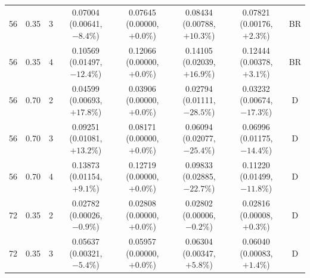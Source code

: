 \begin{longtable}{rrrccccc}
56 & 0.35 & 3 & \shortstack{0.07004\\(0.00641, $-8.4\%$)} & \shortstack{0.07645\\(0.00000, $+0.0\%$)} & \shortstack{0.08434\\(0.00788, $+10.3\%$)} & \shortstack{0.07821\\(0.00176, $+2.3\%$)} & BR \\
56 & 0.35 & 4 & \shortstack{0.10569\\(0.01497, $-12.4\%$)} & \shortstack{0.12066\\(0.00000, $+0.0\%$)} & \shortstack{0.14105\\(0.02039, $+16.9\%$)} & \shortstack{0.12444\\(0.00378, $+3.1\%$)} & BR \\
56 & 0.70 & 2 & \shortstack{0.04599\\(0.00693, $+17.8\%$)} & \shortstack{0.03906\\(0.00000, $+0.0\%$)} & \shortstack{0.02794\\(0.01111, $-28.5\%$)} & \shortstack{0.03232\\(0.00674, $-17.3\%$)} & D \\
56 & 0.70 & 3 & \shortstack{0.09251\\(0.01081, $+13.2\%$)} & \shortstack{0.08171\\(0.00000, $+0.0\%$)} & \shortstack{0.06094\\(0.02077, $-25.4\%$)} & \shortstack{0.06996\\(0.01175, $-14.4\%$)} & D \\
56 & 0.70 & 4 & \shortstack{0.13873\\(0.01154, $+9.1\%$)} & \shortstack{0.12719\\(0.00000, $+0.0\%$)} & \shortstack{0.09833\\(0.02885, $-22.7\%$)} & \shortstack{0.11220\\(0.01499, $-11.8\%$)} & D \\
72 & 0.35 & 2 & \shortstack{0.02782\\(0.00026, $-0.9\%$)} & \shortstack{0.02808\\(0.00000, $+0.0\%$)} & \shortstack{0.02802\\(0.00006, $-0.2\%$)} & \shortstack{0.02816\\(0.00008, $+0.3\%$)} & D \\
72 & 0.35 & 3 & \shortstack{0.05637\\(0.00321, $-5.4\%$)} & \shortstack{0.05957\\(0.00000, $+0.0\%$)} & \shortstack{0.06304\\(0.00347, $+5.8\%$)} & \shortstack{0.06040\\(0.00083, $+1.4\%$)} & D \\

\end{longtable}

